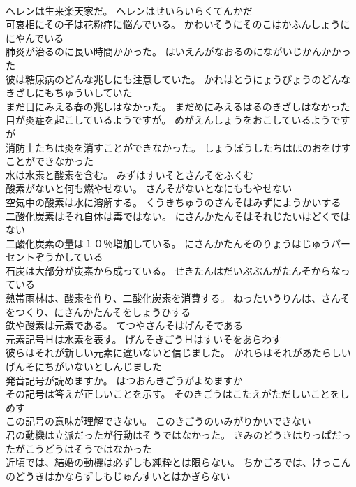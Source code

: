\documentclass[8pt]{extreport}
\begin{document}
\begin{CJK}{UTF8}{min}
\\	ヘレンは生来楽天家だ。	ヘレンはせいらいらくてんかだ 
\\	可哀相にその子は花粉症に悩んでいる。	かわいそうにそのこはかふんしょうににやんでいる 
\\	肺炎が治るのに長い時間かかった。	はいえんがなおるのにながいじかんかかった 
\\	彼は糖尿病のどんな兆しにも注意していた。	かれはとうにょうびょうのどんなきざしにもちゅういしていた 
\\	まだ目にみえる春の兆しはなかった。	まだめにみえるはるのきざしはなかった 
\\	目が炎症を起こしているようですが。	めがえんしょうをおこしているようですが 
\\	消防士たちは炎を消すことができなかった。	しょうぼうしたちはほのおをけすことができなかった 
\\	水は水素と酸素を含む。	みずはすいそとさんそをふくむ 
\\	酸素がないと何も燃やせない。	さんそがないとなにももやせない 
\\	空気中の酸素は水に溶解する。	くうきちゅうのさんそはみずにようかいする 
\\	二酸化炭素はそれ自体は毒ではない。	にさんかたんそはそれじたいはどくではない 
\\	二酸化炭素の量は１０％増加している。	にさんかたんそのりょうはじゅうパーセントぞうかしている 
\\	石炭は大部分が炭素から成っている。	せきたんはだいぶぶんがたんそからなっている 
\\	熱帯雨林は、酸素を作り、二酸化炭素を消費する。	ねったいうりんは、さんそをつくり、にさんかたんそをしょうひする 
\\	鉄や酸素は元素である。	てつやさんそはげんそである 
\\	元素記号Ｈは水素を表す。	げんそきごうＨはすいそをあらわす 
\\	彼らはそれが新しい元素に違いないと信じました。	かれらはそれがあたらしいげんそにちがいないとしんじました 
\\	発音記号が読めますか。	はつおんきごうがよめますか 
\\	その記号は答えが正しいことを示す。	そのきごうはこたえがただしいことをしめす 
\\	この記号の意味が理解できない。	このきごうのいみがりかいできない 
\\	君の動機は立派だったが行動はそうではなかった。	きみのどうきはりっぱだったがこうどうはそうではなかった 
\\	近頃では、結婚の動機は必ずしも純粋とは限らない。	ちかごろでは、けっこんのどうきはかならずしもじゅんすいとはかぎらない 

\end{CJK}
\end{document}

